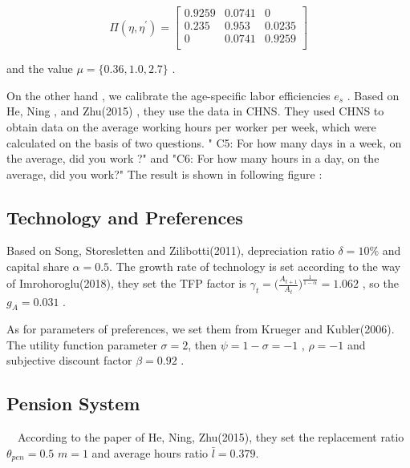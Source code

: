 \documentclass{article}
\begin{document}
        \begin{equation}
            \Pi(\eta,\eta^{'})=  
            \left[
                \begin{array}{ccc}
                    0.9259 & 0.0741 & 0 \\
                    0.235 & 0.953 & 0.0235 \\
                    0 & 0.0741 & 0.9259 \\
                \end{array}  
            \right] 
        \end{equation}

        and the value $\mu=\{0.36,1.0,2.7\}$ .

        On the other hand , we calibrate the age-specific labor efficiencies $e_s$ . Based on He, Ning , and Zhu(2015) , they use the data in CHNS. 
        They used CHNS to obtain data on the average working hours per worker per week, which were calculated on the basis of two questions. " C5: For how many days in a week, on the average, did you work ?" and "C6: For how many hours in a day, on the average, did you work?" 
        The result is shown in following figure : 
        
    \subsection{Technology and Preferences}
        Based on Song, Storesletten and Zilibotti(2011), depreciation ratio $\delta=10\%$ and capital share $\alpha=0.5$.
        The growth rate of technology is set according to the way of Imrohoroglu(2018), they set the TFP factor
        is $\gamma_t=\big(\frac{A_{t+1}}{A_t}\big)^{\frac{1}{1-\alpha}}=1.062$ , so the $g_A=0.031$ .
        
        As for parameters of preferences, we set them from Krueger and Kubler(2006). 
        The utility function parameter $\sigma=2$, then $\psi=1-\sigma=-1$ , $\rho=-1$ and subjective discount factor $\beta=0.92$ . 

    \subsection{Pension System}
        ~\
        According to the paper of He, Ning, Zhu(2015), they set the replacement ratio $\theta_{pen}=0.5$ $m=1$ and average
        hours ratio $\bar{l}=0.379$.
    
\end{document}
